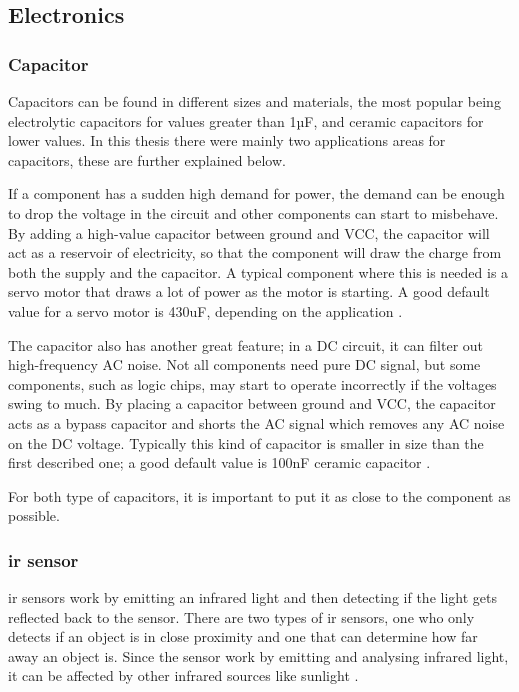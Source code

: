 \subsection{Electronics}
\subsubsection{Capacitor}
\label{sec:capacitor}
Capacitors can be found in different sizes and materials, the most popular being electrolytic capacitors for values greater than 1µF, and ceramic capacitors for lower values. In this thesis there were mainly two applications areas for capacitors, these are further explained below.

If a component has a sudden high demand for power, the demand can be enough to drop the voltage in the circuit and other components can start to misbehave. By adding a high-value capacitor between ground and VCC, the capacitor will act as a reservoir of electricity, so that the component will draw the charge from both the supply and the capacitor. A typical component where this is needed is a servo motor that draws a lot of power as the motor is starting. A good default value for a servo motor is 430uF, depending on the application \cite{highcapacitor}.

The capacitor also has another great feature; in a DC circuit, it can filter out high-frequency AC noise. Not all components need pure DC signal, but some components, such as logic chips, may start to operate incorrectly if the voltages swing to much. By placing a capacitor between ground and VCC, the capacitor acts as a bypass capacitor and shorts the AC signal which removes any AC noise on the DC voltage. Typically this kind of capacitor is smaller in size than the first described one; a good default value is 100nF ceramic capacitor \cite{lowcapacitor}.

For both type of capacitors, it is important to put it as close to the component as possible.

\subsubsection{\acrlong{ir} sensor}
\acrfull{ir} sensors work by emitting an infrared light and then detecting if the light gets reflected back to the sensor. There are two types of \acrshort{ir} sensors, one who only detects if an object is in close proximity and one that can determine how far away an object is. Since the sensor work by emitting and analysing infrared light, it can be affected by other infrared sources like sunlight \cite{infrared}. 

